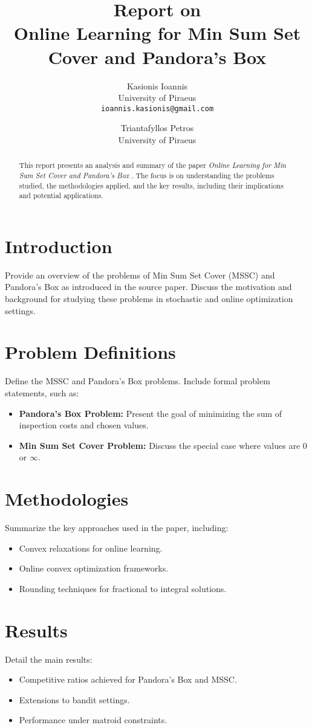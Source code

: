 \documentclass[11pt,a4paper]{article}
\title{Report on \\ \textbf{Online Learning for Min Sum Set Cover and Pandora's Box}}
\author{
    Kasionis Ioannis \\ University of Piraeus \\ \texttt{ioannis.kasionis@gmail.com}
    \and
    Triantafyllos Petros \\ University of Piraeus \\ \texttt{}
}
\date{}
\begin{document}
\maketitle

\begin{abstract}
This report presents an analysis and summary of the paper \textit{Online Learning for Min Sum Set Cover and Pandora's Box} \cite{gergatsouli2022online}. The focus is on understanding the problems studied, the methodologies applied, and the key results, including their implications and potential applications.
\end{abstract}

\section{Introduction}
Provide an overview of the problems of Min Sum Set Cover (MSSC) and Pandora's Box as introduced in the source paper. Discuss the motivation and background for studying these problems in stochastic and online optimization settings.

\section{Problem Definitions}
Define the MSSC and Pandora's Box problems. Include formal problem statements, such as:
\begin{itemize}
    \item \textbf{Pandora's Box Problem:} Present the goal of minimizing the sum of inspection costs and chosen values.
    \item \textbf{Min Sum Set Cover Problem:} Discuss the special case where values are 0 or $\infty$.
\end{itemize}

\section{Methodologies}
Summarize the key approaches used in the paper, including:
\begin{itemize}
    \item Convex relaxations for online learning.
    \item Online convex optimization frameworks.
    \item Rounding techniques for fractional to integral solutions.
\end{itemize}

\section{Results}
Detail the main results:
\begin{itemize}
    \item Competitive ratios achieved for Pandora's Box and MSSC.
    \item Extensions to bandit settings.
    \item Performance under matroid constraints.
\end{itemize}
\end{document}
